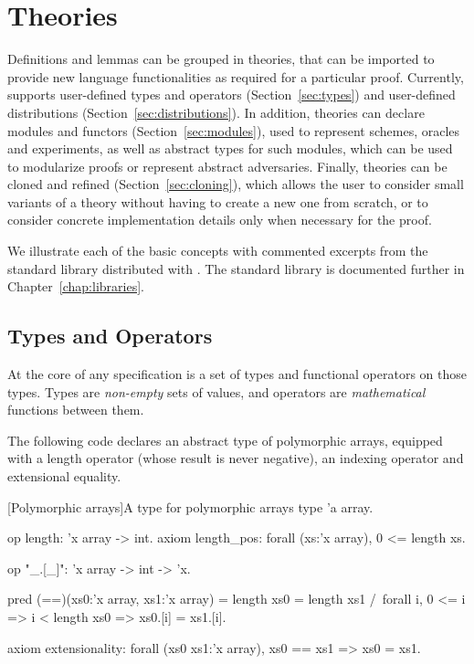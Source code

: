 
\chapter{Theories}

Definitions and lemmas can be grouped in theories, that can be imported to
provide new language functionalities as required for a particular proof.
Currently, \EC supports user-defined types and operators
(Section~\ref{sec:types}) and user-defined distributions
(Section~\ref{sec:distributions}). In addition, theories can declare modules and
functors (Section~\ref{sec:modules}), used to represent schemes, oracles and
experiments, as well as abstract types for such modules, which can be used to
modularize proofs or represent abstract adversaries. Finally, theories can be
cloned and refined (Section~\ref{sec:cloning}), which allows the user to
consider small variants of a theory without having to create a new one from
scratch, or to consider concrete implementation details only when necessary for
the proof.

We illustrate each of the basic concepts with commented excerpts from the
standard library distributed with \EC. The standard library is documented
further in Chapter~\ref{chap:libraries}.

\section{Types and Operators\label{sec:types}}

At the core of any \EC specification is a set of types and functional operators
on those types. Types are \emph{non-empty} sets of values, and operators are
\emph{mathematical} functions between them.


The following \EC code declares an abstract type of polymorphic arrays, equipped
with a length operator (whose result is never negative), an indexing operator
and extensional equality.

\begin{easycrypt}[label={lst:arrays}]{[Polymorphic arrays]A type for polymorphic arrays}
type 'a array.

op length: 'x array -> int.
axiom length_pos: forall (xs:'x array), 0 <= length xs.

op "_.[_]": 'x array -> int -> 'x.

pred (==)(xs0:'x array, xs1:'x array) =
  length xs0 = length xs1 /\
  forall i, 0 <= i => i < length xs0 => xs0.[i] = xs1.[i].

axiom extensionality: forall (xs0 xs1:'x array),
  xs0 == xs1 => xs0 = xs1.
\end{easycrypt}

